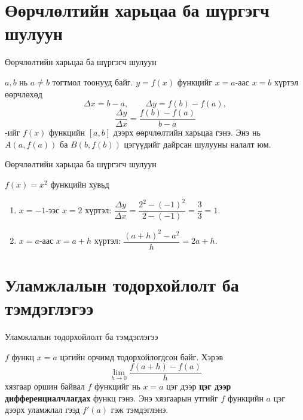 

\section{Өөрчлөлтийн харьцаа ба шүргэгч шулуун}
\begin{frame}[allowframebreaks]{Өөрчлөлтийн харьцаа ба шүргэгч шулуун}
\begin{definition}
$a,b$ нь $a\ne b$ тогтмол тоонууд байг. $y=f(x)$ функцийг $x=a$-аас $x=b$ хүртэл өөрчлөхөд
\[
\Delta x=b-a,\qquad \Delta y=f(b)-f(a),
\]
\[
\frac{\Delta y}{\Delta x}=\frac{f(b)-f(a)}{b-a}
\]
-ийг $f(x)$ функцийн $[a,b]$ дээрх өөрчлөлтийн харьцаа гэнэ. Энэ нь $A(a,f(a))$ ба $B(b,f(b))$ цэгүүдийг дайрсан шулууны налалт юм.
\end{definition}
\end{frame}

\begin{frame}[allowframebreaks]{Өөрчлөлтийн харьцаа ба шүргэгч шулуун}
\begin{example}
$f(x)=x^2$ функцийн хувьд
\begin{enumerate}
  \item $x=-1$-ээс $x=2$ хүртэл: $\dfrac{\Delta y}{\Delta x}=\dfrac{2^2-(-1)^2}{2-(-1)}=\dfrac{3}{3}=1$.
  \item $x=a$-аас $x=a+h$ хүртэл: $\dfrac{(a+h)^2-a^2}{h}=2a+h$.
\end{enumerate}
\end{example}
\end{frame}

\section{Уламжлалын тодорхойлолт ба тэмдэглэгээ}
\begin{frame}[allowframebreaks]{Уламжлалын тодорхойлолт ба тэмдэглэгээ}
\begin{definition}
$f$ функц $x=a$ цэгийн орчимд тодорхойлогдсон байг. Хэрэв
\[
\lim_{h\to 0}\frac{f(a+h)-f(a)}{h}
\]
хязгаар оршин байвал $f$ функцийг нь $x=a$ цэг дээр \textbf{цэг дээр дифференциалчлагдах} функц гэнэ. Энэ хязгаарын утгийг $f$ функцийн $a$ цэг дээрх уламжлал гээд $f'(a)$ гэж тэмдэглэнэ.
\end{definition}
\end{frame}

